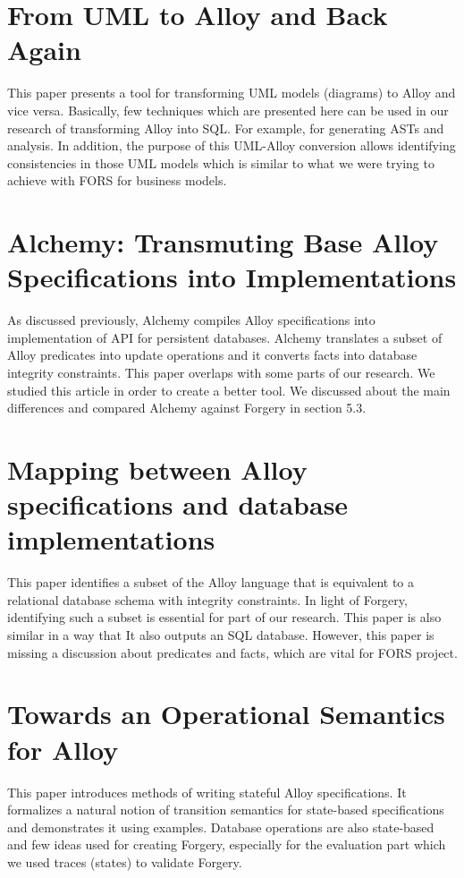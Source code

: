 \documentclass[oneside]{book}
\begin{document}
\section{From UML to Alloy and Back Again}
This paper presents a tool for transforming UML models (diagrams) to Alloy and vice versa. Basically, few techniques which are presented here can be used in our research of transforming Alloy into SQL. For example, for generating ASTs and analysis. In addition, the purpose of this UML-Alloy conversion allows identifying consistencies in those UML models which is similar to what we were trying to achieve with FORS for business models. 

\section{Alchemy: Transmuting Base Alloy Specifications into Implementations}
As discussed previously, Alchemy compiles Alloy specifications into implementation of API for persistent databases. Alchemy translates a subset of Alloy predicates into update operations and it converts facts into database integrity constraints. This paper overlaps with some parts of our research. We studied this article in order to create a better tool. We discussed about the main differences and compared Alchemy against Forgery in section 5.3.

\section{Mapping between Alloy specifications and database implementations}

This paper identifies a subset of the Alloy language that is equivalent to a relational database schema with integrity constraints. In light of Forgery, identifying such a subset is essential for part of our research. This paper is also similar in a way that It also outputs an SQL database. However, this paper is missing a discussion about predicates and facts, which are vital for FORS project.

\section{Towards an Operational Semantics for Alloy}
This paper introduces methods of writing stateful Alloy specifications. It formalizes a natural notion of transition semantics for state-based specifications and demonstrates it using examples. Database operations are also state-based and few ideas used for creating Forgery, especially for the evaluation part which we used traces (states) to validate Forgery.
\end{document}
